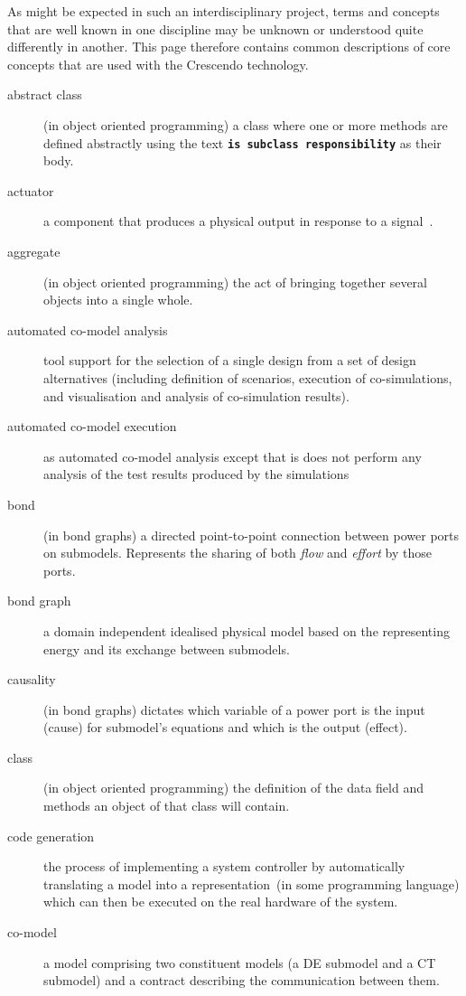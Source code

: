 \documentclass{crescendorepchap}
\begin{document}
As might be expected in such an interdisciplinary project, terms and
concepts that are well known in one discipline may be unknown or
understood quite differently in another. This page therefore contains
common descriptions of core concepts that are
used with the Crescendo technology.

\begin{description}
\item[abstract class] (in object oriented programming) a class where one or more methods are defined abstractly using the text \textbf{\texttt{is subclass responsibility}} as their body.
\item[actuator] a component that produces a physical output in response to a signal~\cite{IEEE100}.
\item[aggregate] (in object oriented programming) the act of bringing together several objects into a single whole.
\item[automated co-model analysis] tool support for the selection of a single design from a set of design alternatives (including definition of scenarios, execution of co-simulations, and visualisation and analysis of co-simulation results).
\item[automated co-model execution] as automated co-model analysis except that is does not perform any analysis of the test results produced by the simulations
\item[bond] (in bond graphs) a directed point-to-point connection between power ports on submodels.  Represents the sharing of both \textit{flow} and \textit{effort} by those ports.
\item[bond graph] a domain independent idealised physical model based on the representing energy and its exchange between submodels.
\item[causality] (in bond graphs) dictates which variable of a power port is the input (cause) for submodel's equations and which is the output (effect).
\item[class] (in object oriented programming) the definition of the data field and methods an object of that class will contain.
\item[code generation] the process of implementing a system controller by automatically translating a model into a representation~(in some programming language) which can then be executed on the real hardware of the system.
\item[co-model] a model comprising two constituent models (a DE submodel and a CT submodel) and a contract describing the communication between them.

\end{description}
\end{document}

